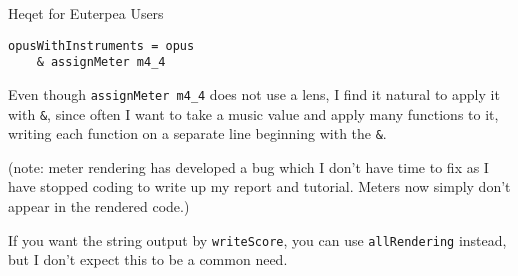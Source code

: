 \documentclass{article}
\begin{document}
\begin{section}{Heqet for Euterpea Users}
\begin{verbatim}opusWithInstruments = opus 
    & assignMeter m4_4
\end{verbatim}

Even though \verb+assignMeter m4_4+ does not use a lens, I find it natural to apply it with \verb+&+, since often I want to take a music value and apply many functions to it, writing each function on a separate line beginning with the \verb+&+. 

(note: meter rendering has developed a bug which I don't have time to fix as I have stopped coding to write up my report and tutorial. Meters now simply don't appear in the rendered code.)

If you want the string output by \verb+writeScore+, you can use \verb+allRendering+ instead, but I don't expect this to be a common need.

\end{section}
\end{document}
